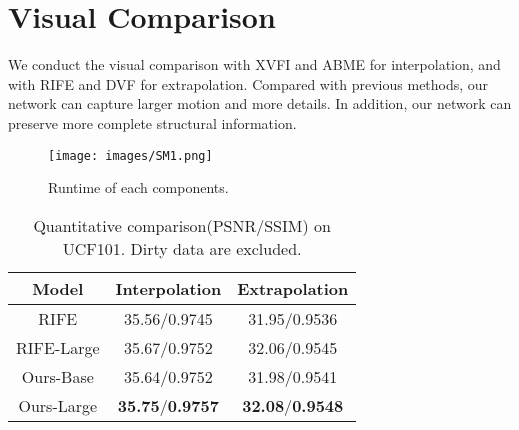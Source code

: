 \documentclass[sigconf]{acmart}
\begin{document}
\section{Visual Comparison}

We conduct the visual comparison with XVFI\cite{sim2021xvfi} and ABME\cite{park2021asymmetric} for interpolation, and with RIFE and DVF\cite{liu2017video} for extrapolation. Compared with previous methods, our network can capture larger motion and more details. In addition, our network can preserve more complete structural information.


\begin{figure}[h]
    \centering
    \texttt{[image: images/SM1.png]}
    \caption{Runtime of each components.}
    \label{fig-sm1}
\end{figure}

\begin{table}[h]
    \caption{Quantitative comparison(PSNR/SSIM) on UCF101. Dirty data are excluded. }
    \label{tab-sm1}
	\centering
	\begin{tabular}{c c c}
	    \midrule Model  & Interpolation & Extrapolation \\
	    \midrule RIFE & 35.56/0.9745 & 31.95/0.9536 \\
		RIFE-Large & 35.67/0.9752 & 32.06/0.9545 \\
	    \midrule Ours-Base & 35.64/0.9752 & 31.98/0.9541 \\
		Ours-Large & \textbf{35.75}/\textbf{0.9757} & \textbf{32.08}/\textbf{0.9548} \\
	    \midrule \end{tabular}
\end{table}
\end{document}
